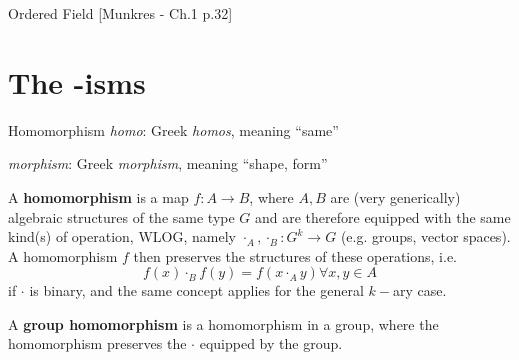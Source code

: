 \documentclass[a4paper, 10pt]{article}
\begin{document}

\begin{definition} {Ordered Field}
    [Munkres - Ch.1 p.32]
\end{definition}
\section{The -isms}
\begin{definition} {Homomorphism}
    \textit{homo}: Greek \textit{homos}, meaning ``same''

    \textit{morphism}: Greek \textit{morphism}, meaning ``shape, form''

    A \textbf{homomorphism} is a map \(f: A \to B\),  where \(A, B\) are (very generically) algebraic structures of the same type \(G\) and are therefore equipped with the same kind(s) of operation, WLOG, namely \(\cdot_A, \cdot_B: G^k \to G\) \; (e.g. groups, vector spaces). A homomorphism \(f\) then preserves the structures of these operations, i.e. \[
        f(x) \cdot_B f(y) = f(x \cdot_A y) \forall x, y \in A
    \]
    if \(\cdot\) is binary, and the same concept applies for the general \(k-\)ary case.
\end{definition}

\:\newline
\begin{example}
    A \textbf{group homomorphism} is a homomorphism in a group, where the homomorphism preserves the \(\cdot\) equipped by the group.
\end{example}
\end{document}
